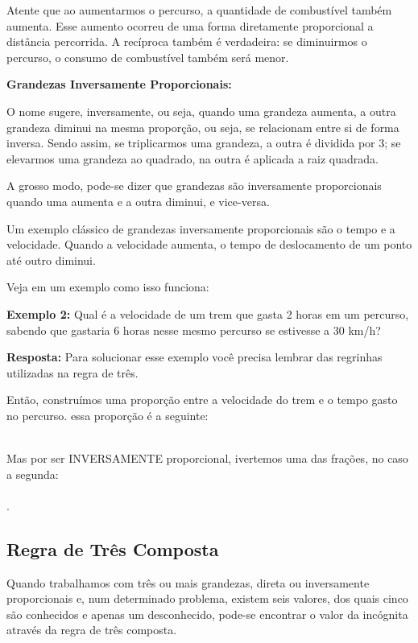 \begin{multicols*}{2}
Atente que ao aumentarmos o percurso, a quantidade de combustível também aumenta. Esse aumento ocorreu de uma forma diretamente proporcional a distância percorrida. A recíproca também é verdadeira: se diminuirmos o percurso, o consumo de combustível também será menor.

\textbf{Grandezas Inversamente Proporcionais:}

O nome sugere, inversamente, ou seja, quando uma grandeza aumenta, a outra grandeza diminui na mesma proporção, ou seja, se relacionam entre si de forma inversa. Sendo assim, se triplicarmos uma grandeza, a outra é dividida por 3; se elevarmos uma grandeza ao quadrado, na outra é aplicada a raiz quadrada.

A grosso modo, pode-se dizer que grandezas são inversamente proporcionais quando uma aumenta e a outra diminui, e vice-versa.

Um exemplo clássico de grandezas inversamente proporcionais são o tempo e a velocidade. Quando a velocidade aumenta, o tempo de deslocamento de um ponto até outro diminui.

Veja em um exemplo como isso funciona:

\textbf{Exemplo 2:} Qual é a velocidade de um trem que gasta 2 horas em um percurso, sabendo que gastaria 6 horas nesse mesmo percurso se estivesse a 30 km/h?

\textbf{Resposta:} Para solucionar esse exemplo você precisa lembrar das regrinhas utilizadas na regra de três.

Então, construímos uma proporção entre a velocidade do trem e o tempo gasto no percurso. essa proporção é a seguinte:

\\

Mas por ser INVERSAMENTE proporcional, ivertemos uma das frações, no caso a segunda:\\

\\

.

\subsection{Regra de Três Composta}

Quando trabalhamos com três ou mais grandezas, direta ou inversamente proporcionais e, num determinado problema, existem seis valores, dos quais cinco são conhecidos e apenas um desconhecido, pode-se encontrar o valor da incógnita através da regra de três composta.


\end{multicols*}
